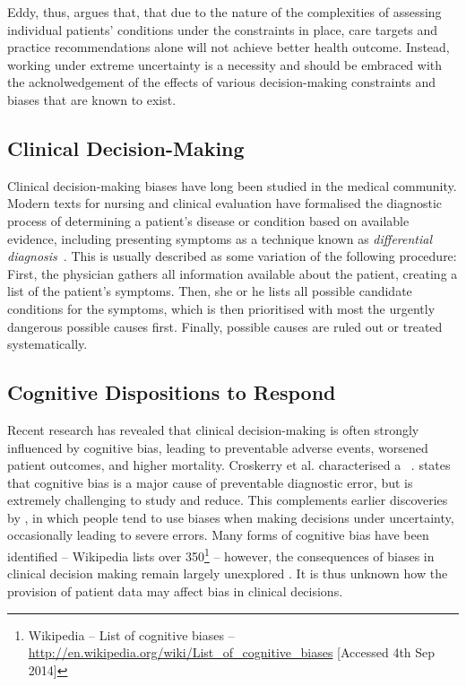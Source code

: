 \documentclass{sigchi}
\begin{document}
Eddy, thus, argues that, that due to the nature of the complexities of assessing individual patients' conditions under the constraints in place, care targets and practice recommendations alone will not achieve better health outcome.  Instead, working under extreme uncertainty is a necessity and should be embraced with the acknolwedgement of the effects of various decision-making constraints and biases that are known to exist.

\subsection{Clinical Decision-Making} 

Clinical decision-making biases have long been studied in the medical community.  
Modern texts for nursing and clinical evaluation have formalised the diagnostic process of determining a patient's disease or condition based on available evidence, including presenting symptoms as a technique known as \emph{differential diagnosis}~\cite{thompson2002clinical}.  This is usually described as some variation of the following procedure: First, the physician gathers all information available about the patient, creating a list of the patient's symptoms.  Then, she or he lists all possible candidate conditions for the symptoms, which is then prioritised with most the urgently dangerous possible causes first.  Finally, possible causes are ruled out or treated systematically.  

\subsection{Cognitive Dispositions to Respond}

Recent research has revealed that clinical decision-making is often strongly influenced by cognitive bias, leading to preventable adverse events, worsened patient outcomes, and higher mortality.  Croskerry et al. characterised a ~\citep{Croskerry2013}. \citet{Graber2002} states that cognitive bias is a major cause of preventable diagnostic error, but is extremely challenging to study and reduce. This complements earlier discoveries by \citet{Kahneman1982}, in which people tend to use biases when making decisions under uncertainty, occasionally leading to severe errors. Many forms of cognitive bias have been identified -- Wikipedia lists over 350\footnote{Wikipedia -- List of cognitive biases -- \url{http://en.wikipedia.org/wiki/List_of_cognitive_biases} [Accessed 4th Sep 2014]} -- however, the consequences of biases in clinical decision making remain largely unexplored \citep{Croskerry2013}. It is thus unknown how the provision of patient data may affect bias in clinical decisions.
\end{document}
